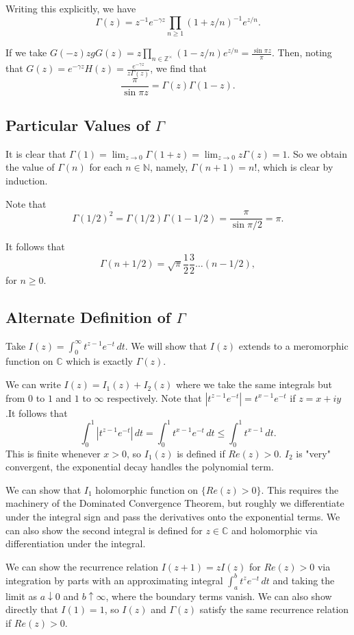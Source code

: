 \documentclass[12pt]{scrartcl}
\newcommand{\N}{\mathbb{N}}
\newcommand{\Z}{\mathbb{Z}}
\newcommand{\C}{\mathbb C}
\begin{document}
Writing this explicitly, we have
$$\boxed{\Gamma(z) = z^{-1} e^{-\gamma z}\prod_{n \ge 1}(1 + z/n)^{-1} e^{z/n}}.$$

If we take $G(-z) z gG(z) = z \prod_{n \in \Z^\times} (1-z/n)e^{z/n} = \frac{\sin{\pi z}}{\pi}.$  Then, noting that $G(z) = e^{-\gamma z}H(z) = \frac{e^{-\gamma z}}{z\Gamma(z)}$, we find that 
$$\frac{\pi}{\sin{\pi z}} = \Gamma(z) \Gamma(1-z).$$

\subsection{Particular Values of $\Gamma$}
It is clear that $\Gamma(1) = \lim_{z \to 0} \Gamma(1 + z) = \lim_{z \to 0}z\Gamma(z) = 1$.  So we obtain the value of $\Gamma(n)$ for each $n \in \N$, namely, $\Gamma(n+1) = n!$, which is clear by induction.

Note that 
$$\Gamma(1/2)^2 = \Gamma(1/2)\Gamma(1 - 1/2) = \frac{\pi}{\sin{\pi/2}} = \pi.$$

It follows that 
$$\Gamma(n + 1/2) = \sqrt{\pi} \frac{1}{2} \frac{3}{2} \dots (n - 1/2),$$
for $n \ge 0$.

\subsection{Alternate Definition of $\Gamma$}
Take $I(z) = \int_{0}^\infty t^{z-1} e^{-t}\,dt$.      We will show that $I(z)$ extends to a meromorphic function on $\C$ which is exactly $\Gamma(z)$.

We can write $I(z) = I_1(z) + I_2(z)$ where we take the same integrals but from $0$ to $1$ and $1$ to $\infty$ respectively.  Note that $|t^{z-1}e^{-t}| = t^{x-1} e^{-t}$ if $z = x+iy$.It follows that $$\int_{0}^1 |t^{z-1}e^{-t}|\,dt = \int_{0}^1 t^{x-1} e^{-t}\,dt \le \int_{0}^1 t^{x-1}\,dt.$$
This is finite whenever $x > 0$, so $I_1(z)$ is defined if $Re(z) > 0$. $I_2$ is "very" convergent, the exponential decay handles the polynomial term.

 We can show that $I_1$ holomorphic function on $\{Re(z) > 0\}$.  This requires the machinery of the Dominated Convergence Theorem, but roughly we differentiate under the integral sign and pass the derivatives onto the exponential terms.  We can also show the second integral is defined for $z \in \C$ and holomorphic via differentiation under the integral.
 
 We can show the recurrence relation $I(z+1) = zI(z)$ for $Re(z) > 0$ via integration by parts with an approximating integral $\int_a^b t^z e^{-t}\,dt$ and taking the limit as $a \downarrow 0$ and $b \uparrow \infty$, where the boundary terms vanish.  We can also show directly that $I(1) = 1$, so $I(z)$ and $\Gamma(z)$ satisfy the same recurrence relation if $Re(z) > 0$.
 
\end{document}
